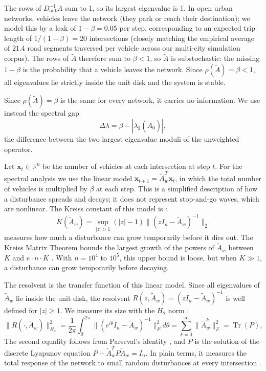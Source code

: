 \documentclass[journal]{IEEEtran}
\begin{document}
The rows of $D_{\text{out}}^{-1} A$ sum to 1, so its largest eigenvalue is 1. In open urban networks, vehicles leave the network (they park or reach their destination); we model this by a leak of $1 - \beta = 0.05$ per step, corresponding to an expected trip length of $1 / (1 - \beta) = 20$ intersections (closely matching the empirical average of $21.4$ road segments traversed per vehicle across our multi-city simulation corpus). The rows of $\tilde{A}$ therefore sum to $\beta < 1$, so $\tilde{A}$ is substochastic: the missing $1 - \beta$ is the probability that a vehicle leaves the network. Since $\rho(\tilde{A}) = \beta < 1$, all eigenvalues lie strictly inside the unit disk and the system is stable.

Since $\rho(\tilde{A}) = \beta$ is the same for every network, it carries no information. We use instead the spectral gap
\begin{equation}
\Delta\lambda = \beta - |\lambda_2(\tilde{A}_0)|,
\label{eq:spectral_gap}
\end{equation}
the difference between the two largest eigenvalue moduli of the unweighted operator.

Let $\mathbf{x}_t \in \mathbb{R}^n$ be the number of vehicles at each intersection at step $t$. For the spectral analysis we use the linear model $\mathbf{x}_{t+1} = \tilde{A}_w^T \mathbf{x}_t$, in which the total number of vehicles is multiplied by $\beta$ at each step. This is a simplified description of how a disturbance spreads and decays; it does not represent stop-and-go waves, which are nonlinear. The Kreiss constant of this model is \cite{Kreiss1962}:
\begin{equation}
K(\tilde{A}_w) = \sup_{|z| > 1} (|z| - 1) \| (z I_n - \tilde{A}_w)^{-1} \|_2
\label{eq:kreiss}
\end{equation}
measures how much a disturbance can grow temporarily before it dies out. The Kreiss Matrix Theorem \cite{Kreiss1962} bounds the largest growth of the powers of $\tilde{A}_w$ between $K$ and $e \cdot n \cdot K$ \cite{Spijker1991}. With $n = 10^4$ to $10^5$, this upper bound is loose, but when $K \gg 1$, a disturbance can grow temporarily before decaying.

The resolvent is the transfer function of this linear model. Since all eigenvalues of $\tilde{A}_w$ lie inside the unit disk, the resolvent $R(z, \tilde{A}_w) = (z I_n - \tilde{A}_w)^{-1}$ is well defined for $|z| \ge 1$. We measure its size with the $H_2$ norm \cite{Zhou1996, Bamieh2012}:
\begin{equation}
\| R(\cdot, \tilde{A}_w) \|_{H_2}^2 = \frac{1}{2\pi} \int_0^{2\pi} \|(e^{i\theta} I_n - \tilde{A}_w)^{-1}\|_F^2 d\theta = \sum_{k=0}^\infty \| \tilde{A}_w^k \|_F^2 = \operatorname{Tr}(P),
\label{eq:hardy_lyapunov}
\end{equation}
The second equality follows from Parseval's identity \cite{Zhou1996}, and $P$ is the solution of the discrete Lyapunov equation $P - \tilde{A}_w^T P \tilde{A}_w = I_n$. In plain terms, it measures the total response of the network to small random disturbances at every intersection \cite{Bamieh2012, Siami2016}.
\end{document}
